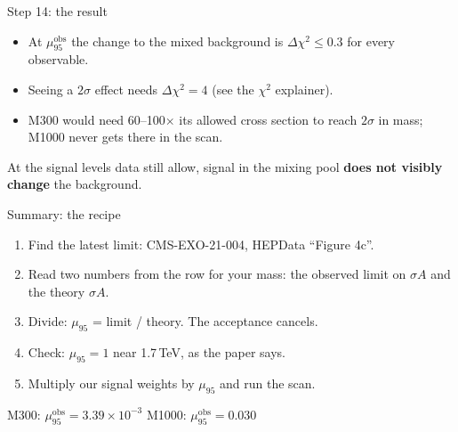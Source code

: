 \documentclass[aspectratio=169,12pt]{beamer}
\newcommand{\muobs}{\mu_{95}^{\text{obs}}}
\newcommand{\takeaway}[1]{\vfill
  \colorbox{boxbg}{\parbox{0.96\textwidth}{\centering\vspace{0.3em}#1\vspace{0.3em}}}
  \par\vspace{0.6em}}
\begin{document}
\begin{frame}{Step 14: the result}
  \begin{itemize}
    \item At $\muobs$ the change to the mixed background is
          $\Delta\chi^2 \le 0.3$ for every observable.
    \item Seeing a $2\sigma$ effect needs $\Delta\chi^2 = 4$
          (see the $\chi^2$ explainer).
    \item M300 would need 60--100$\times$ its allowed cross section to reach
          $2\sigma$ in mass; M1000 never gets there in the scan.
  \end{itemize}
  \takeaway{At the signal levels data still allow, signal in the mixing pool
  \textbf{does not visibly change} the background.}
\end{frame}

\begin{frame}{Summary: the recipe}
  \begin{enumerate}
    \item Find the latest limit: CMS-EXO-21-004, HEPData ``Figure 4c''.
    \item Read two numbers from the row for your mass: the observed limit on
          $\sigma A$ and the theory $\sigma A$.
    \item Divide: $\mu_{95}$ = limit / theory. The acceptance cancels.
    \item Check: $\mu_{95} = 1$ near 1.7\,TeV, as the paper says.
    \item Multiply our signal weights by $\mu_{95}$ and run the scan.
  \end{enumerate}
  \vspace{0.5em}
  \centering
  M300: $\muobs = 3.39\times10^{-3}$ \qquad M1000: $\muobs = 0.030$
\end{frame}
\end{document}
